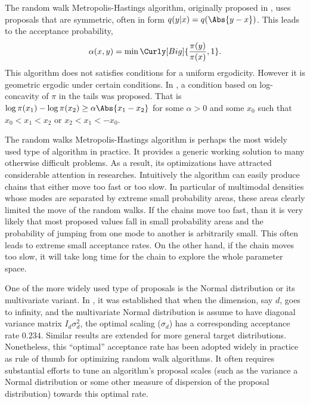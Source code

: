 
The random walk Metropolis-Hastings algorithm, originally proposed in
\cite{Metropolis:1953ex}, uses proposals that are symmetric, often in form
$q(y|x) = q(\Abs{y - x})$. This leads to the acceptance probability,
\begin{equation}
  \alpha(x,y) = \min\Curly[Big]{\frac{\pi(y)}{\pi(x)},1}.
\end{equation}
This algorithm does not satisfies conditions for a uniform ergodicity.
However it is geometric ergodic under certain conditions. In
\cite{Mengersen:1996th}, a condition based on log-concavity of $\pi$ in the
tails was proposed. That is $\log\pi(x_1) - \log\pi(x_2) \ge \alpha\Abs{x_1 -
  x_2}$ for some $\alpha > 0$ and some $x_0$ such that $x_0 < x_1 < x_2$ or
$x_2 < x_1 < -x_0$.

The random walks Metropolis-Hastings algorithm is perhaps the most widely used
type of \mcmc algorithm in practice. It provides a generic working solution to
many otherwise difficult problems. As a result, its optimizations have
attracted considerable attention in researches. Intuitively the algorithm can
easily produce chains that either move too fast or too slow. In particular of
multimodal densities whose modes are separated by extreme small probability
areas, these areas clearly limited the move of the random walks. If the chains
move too fast, than it is very likely that most proposed values fall in small
probability areas and the probability of jumping from one mode to another is
arbitrarily small. This often leads to extreme small acceptance rates. On the
other hand, if the chain moves too slow, it will take long time for the chain
to explore the whole parameter space.

One of the more widely used type of proposals is the Normal distribution or
its multivariate variant. In \cite{Roberts:2001ta}, it was established that
when the dimension, say $d$, goes to infinity, and the multivariate Normal
distribution is assume to have diagonal variance matrix $I_d\sigma_d^2$, the
optimal scaling ($\sigma_d$) has a corresponding acceptance rate $0.234$.
Similar results are extended for more general target distributions.
Nonetheless, this ``optimal'' acceptance rate has been adopted widely in
practice as rule of thumb for optimizing random walk algorithms. It often
requires substantial efforts to tune an algorithm's proposal scales (such as
the variance a Normal distribution or some other measure of dispersion of the
proposal distribution) towards this optimal rate.

